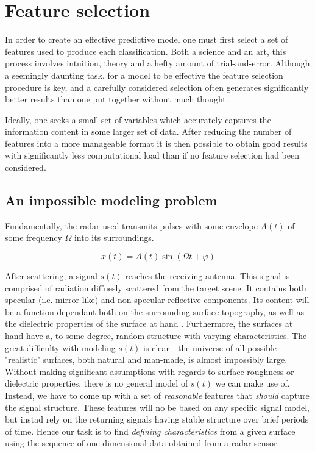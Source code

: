 \chapter{Feature selection}

In order to create an effective predictive model one must first select a set of features used to produce each classification. Both a science and an art, this process involves intuition, theory and a hefty amount of trial-and-error. Although a seemingly daunting task, for a model to be effective the feature selection procedure is key, and a carefully considered selection often generates significantly better results than one put together without much thought. 

Ideally, one seeks a small set of variables which accurately captures the information content in some larger set of data. After reducing the number of features into a more manageable format it is then possible to obtain good results with significantly less computational load than if no feature selection had been considered. 

\section{An impossible modeling problem}

Fundamentally, the radar used transmits pulses with some envelope $A(t)$ of some frequency $\Omega$ into its surroundings.

\begin{equation}
	x(t) = A(t)\sin(\Omega t + \varphi)
\end{equation}

After scattering, a signal $s(t)$ reaches the receiving antenna. This signal is comprised of radiation diffuesly scattered from the target scene. It contains both specular (i.e. mirror-like) and non-specular reflective components. Its content will be a function dependant both on the surrounding surface topography, as well as the dielectric properties of the surface at hand \citep{grossman_popovic_chamberlin_gordon_novotny_2017}. Furthermore, the surfaces at hand have a, to some degree, random structure with varying characteristics. The great difficulty with modeling $s(t)$ is clear - the universe of all possible "realistic" surfaces, both natural and man-made, is almost impossibly large. Without making significant assumptions with regards to surface roughness or dielectric properties, there is no general model of $s(t)$ we can make use of. Instead, we have to come up with a set of \emph{reasonable} features that \emph{should} capture the signal structure. These features will no be based on any specific signal model, but instad rely on the returning signals having stable structure over brief periods of time. Hence our task is to find \emph{defining characteristics} from a given surface using the sequence of one dimensional data obtained from a radar sensor. 


